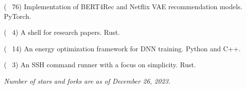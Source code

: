 
\begin{cvlist}

  \cvlistitem
  {\href{https://github.com/jaywonchung/BERT4Rec-VAE-Pytorch}{} {\normalfont ( \faCodeFork~76)}} %
    {Implementation of BERT4Rec and Netflix VAE recommendation models. PyTorch.} %

  \cvlistitem
    {\href{https://github.com/jaywonchung/reason}{} {\normalfont ( \faCodeFork~4)}} %
    {A shell for research papers. Rust.} %

  \cvlistitem
    {\href{https://github.com/SymbioticLab/Zeus}{} {\normalfont ( \faCodeFork~14)}} %
    {An energy optimization framework for DNN training. Python and C++.} %

  \cvlistitem
    {\href{https://github.com/jaywonchung/pegasus}{} {\normalfont ( \faCodeFork~3)}} %
    {An SSH command runner with a focus on simplicity. Rust.} %

\end{cvlist}

\vspace{-5mm}

\begin{cvparagraph}
\textit{Number of stars and forks are as of December 26, 2023.}
\end{cvparagraph}
